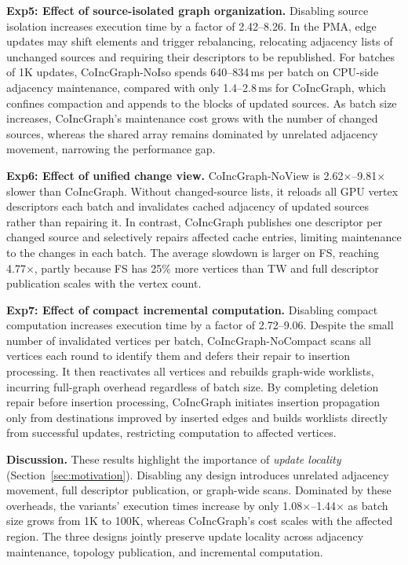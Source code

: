 \textbf{Exp5: Effect of source-isolated graph organization.} Disabling source isolation increases execution time by a factor of 2.42--8.26. In the PMA, edge updates may shift elements and trigger rebalancing, relocating adjacency lists of unchanged sources and requiring their descriptors to be republished. For batches of 1K updates, CoIncGraph-NoIso spends 640--834\,ms per batch on CPU-side adjacency maintenance, compared with only 1.4--2.8\,ms for CoIncGraph, which confines compaction and appends to the blocks of updated sources. As batch size increases, CoIncGraph's maintenance cost grows with the number of changed sources, whereas the shared array remains dominated by unrelated adjacency movement, narrowing the performance gap.

\textbf{Exp6: Effect of unified change view.} CoIncGraph-NoView is 2.62$\times$--9.81$\times$ slower than CoIncGraph. Without changed-source lists, it reloads all GPU vertex descriptors each batch and invalidates cached adjacency of updated sources rather than repairing it. In contrast, CoIncGraph publishes one descriptor per changed source and selectively repairs affected cache entries, limiting maintenance to the changes in each batch. The average slowdown is larger on FS, reaching 4.77$\times$, partly because FS has 25\% more vertices than TW and full descriptor publication scales with the vertex count.

\textbf{Exp7: Effect of compact incremental computation.} Disabling compact computation increases execution time by a factor of 2.72--9.06. Despite the small number of invalidated vertices per batch, CoIncGraph-NoCompact scans all vertices each round to identify them and defers their repair to insertion processing. It then reactivates all vertices and rebuilds graph-wide worklists, incurring full-graph overhead regardless of batch size. By completing deletion repair before insertion processing, CoIncGraph initiates insertion propagation only from destinations improved by inserted edges and builds worklists directly from successful updates, restricting computation to affected vertices.

\textbf{Discussion.} These results highlight the importance of \textit{update locality} (Section~\ref{sec:motivation}). Disabling any design introduces unrelated adjacency movement, full descriptor publication, or graph-wide scans. Dominated by these overheads, the variants' execution times increase by only 1.08$\times$--1.44$\times$ as batch size grows from 1K to 100K, whereas CoIncGraph's cost scales with the affected region. The three designs jointly preserve update locality across adjacency maintenance, topology publication, and incremental computation.

